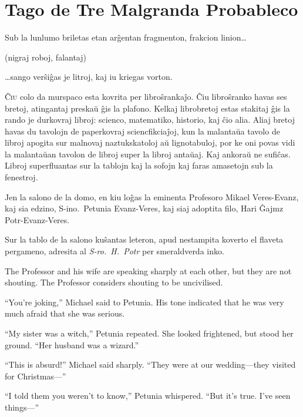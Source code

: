 \chapter{Tago de Tre Malgranda Probableco}

\begin{chapterOpeningQuote}
\noindent
Sub la lunlumo briletas etan arĝentan fragmenton, frakcion linion…

\vspace*{2ex}
(nigraj roboj, falantaj)

\vspace*{2ex}
…sango verŝiĝas je litroj, kaj iu kriegas vorton.
\end{chapterOpeningQuote}

\lettrine{Ĉ}{iu} colo da murspaco esta kovrita per libroŝrankaĵo. Ĉiu libroŝranko havas ses bretoj, atingantaj preskaŭ ĝis la plafono. Kelkaj librobretoj estas stakitaj ĝis la rando je durkovraj libroj: scienco, matematiko, historio, kaj ĉio alia. Aliaj bretoj havas du tavolojn de paperkovraj sciencfikciaĵoj, kun la malantaŭa tavolo de libroj apogita sur malnovaj naztukskatoloj aŭ lignotabuloj, por ke oni povas vidi la malantaŭan tavolon de libroj super la libroj antaŭaj. Kaj ankoraŭ ne sufiĉas. Libroj superfluantas sur la tablojn kaj la sofojn kaj faras amasetojn sub la fenestroj.

Jen la salono de la domo, en kiu loĝas la eminenta Profesoro Mikael Veres\nobreakdash-Evanz, kaj sia edzino, S\nobreakdash-ino.~Petunia Evanz\nobreakdash-Veres, kaj siaj adoptita filo, Hari Ĝajmz Potr-Evanz-Veres.

Sur la tablo de la salono kuŝantas leteron, apud nestampita koverto el flaveta pergameno, adresita al \emph{S\nobreakdash-ro.~H.~Potr} per smeraldverda inko.

The Professor and his wife are speaking sharply at each other, but they are not shouting. The Professor considers shouting to be uncivilised.

“You’re joking,” Michael said to Petunia. His tone indicated that he was very much afraid that she was serious.

“My sister was a witch,” Petunia repeated. She looked frightened, but stood her ground. “Her husband was a wizard.”

“This is absurd!” Michael said sharply. “They were at our wedding—they visited for Christmas—”

“I told them you weren’t to know,” Petunia whispered. “But it’s true. I’ve seen things—”

